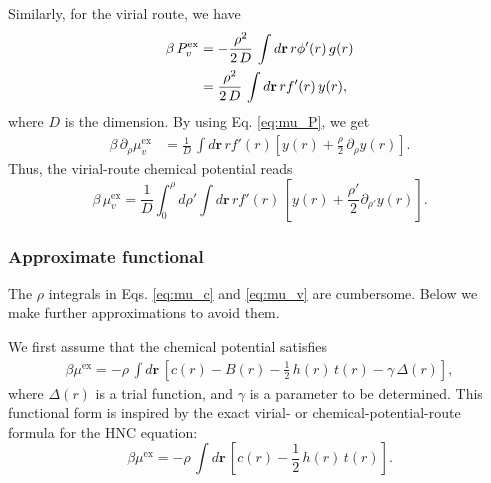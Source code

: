 \documentclass[aip,jcp,reprint,superscriptaddress]{revtex4-1}
\newcommand{\vct}[1]{\mathbf{#1}}
\providecommand{\vr}{} %
\renewcommand{\vr}{\vct{r}}
\newcommand{\supex}[1]{ { { #1 }^{ \mathrm{ex} } } }
\newcommand{\muex}{\supex{\mu}}
\begin{document}
Similarly, for the virial route,
we have
%
\begin{align}
\beta \, P_v^\mathrm{ex}
&=
-\frac{ \rho^2 } { 2 \, D }
\, \int d\vr \, r \phi'(r) \, g(r)
\notag \\
&=
\frac{ \rho^2 } { 2 \, D }
\, \int d\vr \, r f'(r) \, y(r),
\label{eq:P_v}
\end{align}
%
where $D$ is the dimension.
%
By using Eq. \eqref{eq:mu_P},
we get
%
\begin{align}
\beta \, \partial_\rho \mu_v^\mathrm{ex}
&=
\frac{ 1 } { D }
\, \int d\vr \, r f'(r)
\left[
  y(r)
  +
  \frac{\rho}{2} \, \partial_\rho y(r)
\right].
\label{eq:dmu_v}
\end{align}
%
Thus, the virial-route chemical potential reads
%
\begin{equation}
\beta \, \mu_v^\mathrm{ex}
=
\frac{1}{D}
\int_0^\rho d\rho'
  \int d\vr \,
    r f'(r) \,
    \left[
    y(r) + \frac{\rho'}{2} \partial_{\rho'} y(r)
    \right].
\label{eq:mu_v}
\end{equation}





\subsubsection{Approximate functional}





The $\rho$ integrals
in Eqs. \eqref{eq:mu_c} and \eqref{eq:mu_v}
are cumbersome.
%
Below we make further approximations
to avoid them.



We first assume that the chemical potential satisfies
%
\begin{align}
  \beta \muex
  =
  -\rho \, \int d\vr \,
    \left[
        c(r) - B(r)
      - \frac{1}{2} \, h(r) \, t(r)
      - \gamma \, \Delta(r)
    \right],
  \label{eq:muex_trial}
\end{align}
%
where
$\Delta(r)$ is a trial function,
and
$\gamma$ is a parameter to be determined.
%
This functional form is inspired by
the exact virial- or chemical-potential-route formula
for the HNC equation\cite{
morita1960, morita1960I, singer1985}:
%
\begin{equation}
  \beta \muex
  =
  -\rho \, \int d\vr \,
    \left[
      c(r) - \frac{1}{2} \, h(r) \, t(r)
    \right].
  \label{eq:muex_hnc}
\end{equation}
\end{document}
